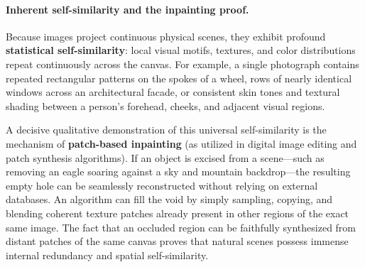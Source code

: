 \paragraph{Inherent self-similarity and the inpainting proof.}
Because images project continuous physical scenes, they exhibit profound \textbf{statistical self-similarity}: local visual motifs, textures, and color distributions repeat continuously across the canvas. For example, a single photograph contains repeated rectangular patterns on the spokes of a wheel, rows of nearly identical windows across an architectural facade, or consistent skin tones and textural shading between a person's forehead, cheeks, and adjacent visual regions.

A decisive qualitative demonstration of this universal self-similarity is the mechanism of \textbf{patch-based inpainting} (as utilized in digital image editing and patch synthesis algorithms). If an object is excised from a scene---such as removing an eagle soaring against a sky and mountain backdrop---the resulting empty hole can be seamlessly reconstructed without relying on external databases. An algorithm can fill the void by simply sampling, copying, and blending coherent texture patches already present in other regions of the exact same image. The fact that an occluded region can be faithfully synthesized from distant patches of the same canvas proves that natural scenes possess immense internal redundancy and spatial self-similarity.

